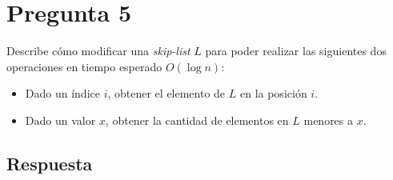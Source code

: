 \section*{Pregunta 5}
\noindent Describe cómo modificar una \textit{skip-list} $L$ para poder realizar las siguientes dos operaciones en tiempo esperado $O(\log n)$:
  \begin{itemize}
  \item Dado un índice $i$, obtener el elemento de $L$ en la posición $i$.
  \item Dado un valor $x$, obtener la cantidad de elementos en $L$ menores a $x$.
  \end{itemize}

\subsection*{Respuesta}

